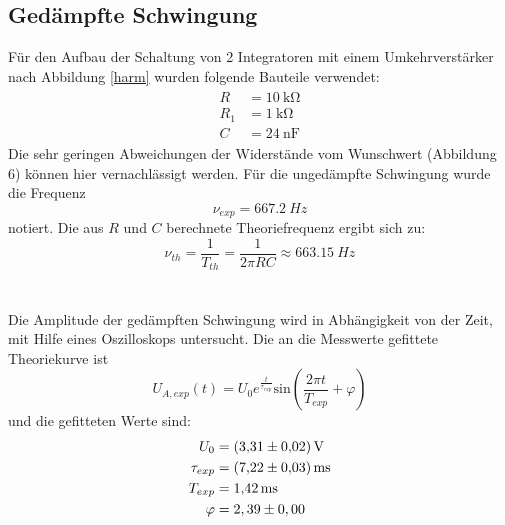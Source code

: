 \documentclass{scrartcl}
\begin{document}
 \subsection{Gedämpfte Schwingung}
 Für den Aufbau der Schaltung von 2 Integratoren mit einem Umkehrverstärker nach Abbildung \ref{harm} wurden folgende Bauteile verwendet:
 \begin{align}
	 \begin{split}
	  R &= \SI{10}{\kilo \ohm}\\
	  R_1 &= \SI{1}{\kilo \ohm}\\
	  C &= \SI{24}{\nano \farad}
   \end{split}
 \end{align}
 Die sehr geringen Abweichungen der Widerstände vom Wunschwert (Abbildung 6) können hier vernachlässigt werden.
 Für die ungedämpfte Schwingung wurde die Frequenz
 \begin{equation}
   \nu_{exp}=\SI{667,2}{Hz}
 \end{equation}
 notiert.
 Die aus $R$ und $C$ berechnete Theoriefrequenz ergibt sich zu:
 \begin{equation}
   \nu_{th}=\frac{1}{T_{th}}=\frac{1}{2 \pi RC} \approx \SI{663,15}{Hz}
 \end{equation}\\
 \\Die Amplitude der gedämpften Schwingung wird in Abhängigkeit von der Zeit, mit Hilfe eines Oszilloskops untersucht.
 Die an die Messwerte gefittete Theoriekurve ist
\begin{equation}
  U_{A,exp}(t)= U_0e^{\frac{t}{\tau_{exp}}}\text{sin}\left( \frac{2 \pi t}{T_{exp}}+\varphi \right)
\end{equation}
und die gefitteten Werte sind:
\begin{align}
  U_0 &= \SI{3,31 \pm 0,02}{\volt}\\
  \tau_{exp} &= \SI{7,22 \pm 0,03}{\milli \second}\\
  T_{exp} &= \SI{1,42 \pm 0,00}{\milli \second}\\
  \varphi &= 2,39 \pm 0,00
\end{align}
\end{document}
